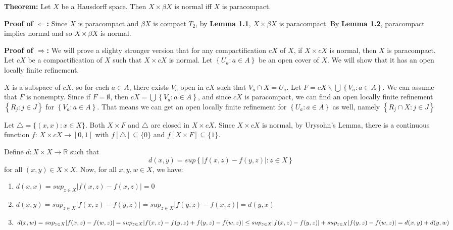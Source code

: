 \documentclass{amsart}
\author{shaun yi cheng}
\begin{document}
\textbf{Theorem:} Let $X$ be a Hausdorff space. Then $X \times \beta X$ is normal iff $X$ is paracompact. 

\vskip10pt

\textbf{Proof of $\Leftarrow$:} 
Since $X$ is paracompact and $\beta X$ is compact $T_2$, by \textbf{Lemma 1.1}, $X\times \beta X$ is paracompact. 
By \textbf{Lemma 1.2}, paracompact implies normal and so $X\times \beta X$ is normal. 

\vskip 15pt



\textbf{Proof of $\Rightarrow$: }
We will prove a slighty stronger version that for any compactification $cX$ of $X$, if $X \times cX$ is normal, 
then $X$ is paracompact. 
\vskip 10pt
Let $cX$ be a compactification of $X$ such that $X \times cX$ is normal. Let 
$\left\{U_a: a \in A\right\}$ be an open cover of $X$. We will show that it has an open locally finite refinement.

\vskip 10pt

$X$ is a subspace of $cX$, so for each $a \in A$, there exists $V_a$ open in $cX$ such that $V_a \cap X = U_a.$ Let $F=cX\backslash \bigcup \left\{V_a: a\in A\right\}$.  We can assume that $F$ is nonempty. Since if $F=\emptyset$, then $cX=\bigcup \left\{V_a: a\in A\right\}$, and since $cX$ is paracompact, we can find an open locally finite refinement $\left\{R_j: j\in J\right\}$ for $\left\{V_a: a\in A\right\}$. That means we can get an open locally finite refinement for $\left\{U_a: a \in A\right\}$ as well, namely  $\left\{R_j\cap X: j\in J\right\}$

\vskip 10pt

Let $\triangle = \{(x,x): x \in X\}.$
Both $X \times F$ and $\triangle$ are closed in $X \times cX $. Since $X \times cX $ is normal, by Urysohn's Lemma, there is 
a continuous function $f$: $X \times cX \rightarrow [0,1]$ with $f[\triangle] \subseteq \{0\}$ and $f[X\times F] \subseteq
 \{1\}$. 
 
\vskip 15pt 

Define $d: X\times X \rightarrow \mathbb{R}$ such that $$d(x,y)=sup \left\{ \left|f(x,z)-f(y,z)\right|: z\in X\right\}$$ for all $(x,y) \in X \times X$. 
Now, for all $x,y,w \in X$, we have: 

\begin{enumerate}
	\item $d(x,x)=sup_{z\in X} |f(x,z)-f(x,z)|=0$
	\item $d(x,y)=sup_{z\in X} |f(x,z)-f(y,z)|=sup_{z\in X} |f(y,z)-f(x,z)|=d(y,x)$
	\item $d(x,w)=sup_{z\in X} |f(x,z)-f(w,z)|\\
	=sup_{z\in X} |f(x,z)-f(y,z)+f(y,z)-f(w,z)|\\
	\leq sup_{z\in X} |f(x,z)-f(y,z)|+sup_{z\in X} |f(y,z)-f(w,z)|\\
	=d(x,y)+d(y,w)$
\end{enumerate}
\end{document}
